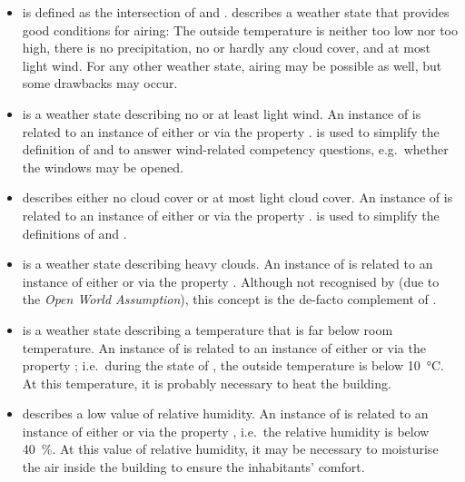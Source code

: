 \begin{itemize}
  \item {} is defined as the intersection of  and .  describes a weather state that provides good conditions for airing: The outside temperature is neither too low nor too high, there is no precipitation, no or hardly any cloud cover, and at most light wind. For any other weather state, airing may be possible as well, but some drawbacks may occur.
  
  \item {} is a weather state describing no or at least light wind. An instance of  is related to an instance of either  or  via the property .  is used to simplify the definition of  and to answer wind-related competency questions, e.g.\ whether the windows may be opened.
  
  \item {} describes either no cloud cover or at most light cloud cover. An instance of  is related to an instance of either  or  via the property .  is used to simplify the definitions of  and .
  
  \item {} is a weather state describing heavy clouds. An instance of  is related to an instance of either  or  via the property . Although not recognised by  (due to the \emph{Open World Assumption}), this concept is the de-facto complement of .
  
  \item {} is a weather state describing a temperature that is far below room temperature. An instance of  is related to an instance of either  or  via the property ; i.e.\ during the state of , the outside temperature is below \SI{10}{\celsius}. At this temperature, it is probably necessary to heat the building.
  
  \item {} describes a low value of relative humidity. An instance of  is related to an instance of either  or  via the property , i.e.\ the relative humidity is below \SI{40}{\percent}. At this value of relative humidity, it may be necessary to moisturise the air inside the building to ensure the inhabitants' comfort.
  

\end{itemize}

